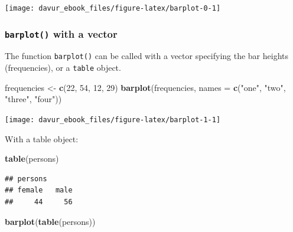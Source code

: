 \documentclass[]{book}
\newenvironment{Shaded}{\begin{snugshade}}{\end{snugshade}}
\newcommand{\DataTypeTok}[1]{\textcolor[rgb]{0.13,0.29,0.53}{#1}}
\newcommand{\DecValTok}[1]{\textcolor[rgb]{0.00,0.00,0.81}{#1}}
\newcommand{\KeywordTok}[1]{\textcolor[rgb]{0.13,0.29,0.53}{\textbf{#1}}}
\newcommand{\NormalTok}[1]{#1}
\newcommand{\StringTok}[1]{\textcolor[rgb]{0.31,0.60,0.02}{#1}}
\begin{document}
\begin{center}\texttt{[image: davur\_ebook\_files/figure-latex/barplot-0-1]} \end{center}

\hypertarget{barplot-with-a-vector}{%
\subsubsection*{\texorpdfstring{\texttt{barplot()} with a vector}{barplot() with a vector}}\label{barplot-with-a-vector}}

The function \texttt{barplot()} can be called with a vector specifying the bar heights (frequencies), or a \texttt{table} object.

\begin{Shaded}
\begin{Highlighting}[]
\NormalTok{frequencies <-}\StringTok{ }\KeywordTok{c}\NormalTok{(}\DecValTok{22}\NormalTok{, }\DecValTok{54}\NormalTok{, }\DecValTok{12}\NormalTok{, }\DecValTok{29}\NormalTok{)}
\KeywordTok{barplot}\NormalTok{(frequencies, }\DataTypeTok{names =} \KeywordTok{c}\NormalTok{(}\StringTok{"one"}\NormalTok{, }\StringTok{"two"}\NormalTok{, }\StringTok{"three"}\NormalTok{, }\StringTok{"four"}\NormalTok{))}
\end{Highlighting}
\end{Shaded}

\begin{center}\texttt{[image: davur\_ebook\_files/figure-latex/barplot-1-1]} \end{center}

With a table object:

\begin{Shaded}
\begin{Highlighting}[]
\KeywordTok{table}\NormalTok{(persons)}
\end{Highlighting}
\end{Shaded}

\begin{verbatim}
## persons
## female   male 
##     44     56
\end{verbatim}

\begin{Shaded}
\begin{Highlighting}[]
\KeywordTok{barplot}\NormalTok{(}\KeywordTok{table}\NormalTok{(persons))}
\end{Highlighting}
\end{Shaded}
\end{document}
